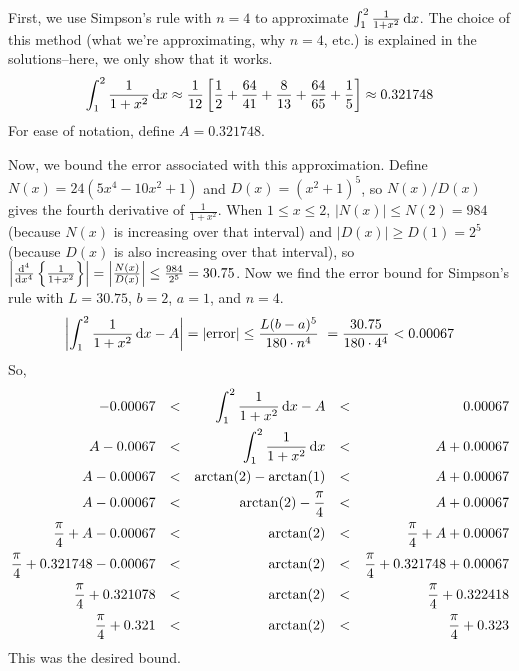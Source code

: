 \begin{answer}

First, we use Simpson's rule with $n=4$  to approximate $\int_1^2 \frac{1}{1+x^2}\,\mathrm{d}x$. The choice of this method (what we're approximating, why $n=4$, etc.) is explained in the solutions--here, we only show that it works.
\[\int_1^2 \frac{1}{1+x^2}\,\mathrm{d}x \approx\frac{1}{12}\left[
\frac{1}{2} + \frac{64}{41}+\frac{8}{13}+\frac{64}{65}+\frac{1}{5}
\right]\approx 0.321748 \]
For ease of notation, define $A=0.321748$.

Now, we bound the error associated with this approximation. Define $N(x) = 24(5x^4-10x^2+1)$ and $D(x) = (x^2+1)^5$, so $N(x)/D(x)$ gives the fourth derivative of $\frac{1}{1+x^2}$. When $1 \le x \le 2$, $|N(x)| \le N(2)=984$ (because $N(x)$ is increasing over that interval) and $|D(x)| \geq D(1) = 2^5$ (because $D(x)$ is also increasing over that interval), so $\left| \frac{\mathrm{d}^4}{\mathrm{d}{x}^4}\left\{\frac{1}{1+x^2}\right\}\right| = \left| \frac{N(x)}{D(x)}\right| \leq \frac{984}{2^5}=30.75$. Now we find the error bound for Simpson's rule with $L=30.75$, $b=2$, $a=1$, and $n=4$.
\[\left| \int_1^2 \frac{1}{1+x^2}\,\mathrm{d}x - A\right| =|\text{error}| \leq \frac{L(b-a)^5}{180\cdot n^4}\
=\frac{30.75}{180\cdot 4^4}<0.00067\]
So,
\begin{align*}
-0.00067 &&<&&  \int_1^2 \frac{1}{1+x^2}\,\mathrm{d}x - A &&<&& 0.00067\\
A-0.0067 &&<&&  \int_1^2 \frac{1}{1+x^2}\,\mathrm{d}x  &&<&& A+0.00067\\
A-0.00067 &&<&& \arctan(2)-\arctan(1) &&<&& A+0.00067\\
A-0.00067 &&<&& \arctan(2)-\frac{\pi}{4} &&<&& A+0.00067\\
\frac{\pi}{4}+A-0.00067 &&<&& \arctan(2) &&<&&\frac{\pi}{4}+ A+0.00067\\
\frac{\pi}{4}+0.321748-0.00067 &&<&& \arctan(2) &&<&&\frac{\pi}{4}+0.321748+0.00067\\
\frac{\pi}{4}+0.321078 &&<&& \arctan(2) &&<&&\frac{\pi}{4}+0.322418\\
\frac{\pi}{4}+0.321 &&<&& \arctan(2) &&<&&\frac{\pi}{4}+0.323
\end{align*}
This was the desired bound.
\end{answer}
